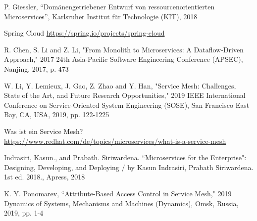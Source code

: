 \begin{thebibliography}{00}

 P. Giessler, ``Dom\"anengetriebener Entwurf von ressourcenorientierten Microservices'', Karlsruher Institut für Technologie (KIT), 2018

Spring Cloud \url{https://spring.io/projects/spring-cloud}

 R. Chen, S. Li and Z. Li, "From Monolith to Microservices: A Dataflow-Driven Approach," 2017 24th Asia-Pacific Software Engineering Conference (APSEC), Nanjing, 2017, p. 473

 W. Li, Y. Lemieux, J. Gao, Z. Zhao and Y. Han, "Service Mesh: Challenges, State of the Art, and Future Research Opportunities," 2019 IEEE International Conference on Service-Oriented System Engineering (SOSE), San Francisco East Bay, CA, USA, 2019, pp. 122-1225

 Was ist ein Service Mesh? \url{https://www.redhat.com/de/topics/microservices/what-is-a-service-mesh}

 Indrasiri, Kasun., and Prabath. Siriwardena. ``Microservices for the Enterprise": Designing, Developing, and Deploying / by Kasun Indrasiri, Prabath Siriwardena. 1st ed. 2018., Apress, 2018

K. Y. Ponomarev, ``Attribute-Based Access Control in Service Mesh," 2019 Dynamics of Systems, Mechanisms and Machines (Dynamics), Omsk, Russia, 2019, pp. 1-4
\end{thebibliography}